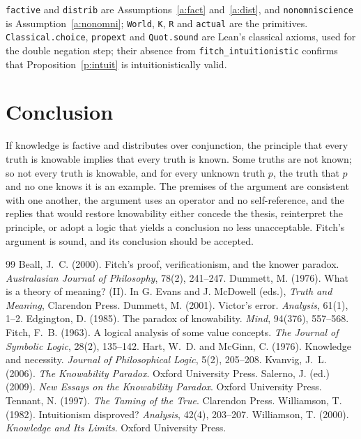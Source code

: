 \documentclass{situationist-preprint}
\begin{document}
\texttt{factive} and \texttt{distrib} are Assumptions~\ref{a:fact} and~\ref{a:dist}, and \texttt{nonomniscience} is Assumption~\ref{a:nonomni}; \texttt{World}, \texttt{K}, \texttt{R} and \texttt{actual} are the primitives. \texttt{Classical.choice}, \texttt{propext} and \texttt{Quot.sound} are Lean's classical axioms, used for the double negation step; their absence from \texttt{fitch\_intuitionistic} confirms that Proposition~\ref{p:intuit} is intuitionistically valid.

\section{Conclusion}

If knowledge is factive and distributes over conjunction, the principle that every truth is knowable implies that every truth is known. Some truths are not known; so not every truth is knowable, and for every unknown truth $p$, the truth that $p$ and no one knows it is an example. The premises of the argument are consistent with one another, the argument uses an operator and no self-reference, and the replies that would restore knowability either concede the thesis, reinterpret the principle, or adopt a logic that yields a conclusion no less unacceptable. Fitch's argument is sound, and its conclusion should be accepted.

\begin{thebibliography}{99}\small
{} Beall, J.~C. (2000). Fitch's proof, verificationism, and the knower paradox. \emph{Australasian Journal of Philosophy}, 78(2), 241--247.
 Dummett, M. (1976). What is a theory of meaning? (II). In G. Evans and J. McDowell (eds.), \emph{Truth and Meaning}, Clarendon Press.
 Dummett, M. (2001). Victor's error. \emph{Analysis}, 61(1), 1--2.
 Edgington, D. (1985). The paradox of knowability. \emph{Mind}, 94(376), 557--568.
 Fitch, F.~B. (1963). A logical analysis of some value concepts. \emph{The Journal of Symbolic Logic}, 28(2), 135--142.
 Hart, W.~D. and McGinn, C. (1976). Knowledge and necessity. \emph{Journal of Philosophical Logic}, 5(2), 205--208.
 Kvanvig, J.~L. (2006). \emph{The Knowability Paradox}. Oxford University Press.
 Salerno, J. (ed.) (2009). \emph{New Essays on the Knowability Paradox}. Oxford University Press.
 Tennant, N. (1997). \emph{The Taming of the True}. Clarendon Press.
 Williamson, T. (1982). Intuitionism disproved? \emph{Analysis}, 42(4), 203--207.
 Williamson, T. (2000). \emph{Knowledge and Its Limits}. Oxford University Press.
\end{thebibliography}
\end{document}
